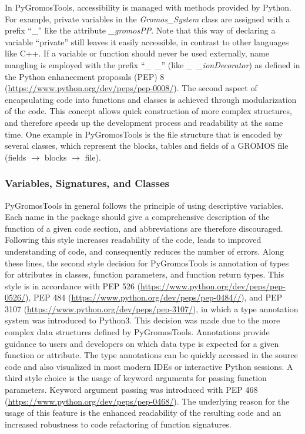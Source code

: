 In PyGromosTools, accessibility is managed with methods provided by Python. For example, private variables in the \textit{Gromos\_System} class are assigned with a prefix ``\_'' like the attribute \textit{\_gromosPP}. Note that this way of declaring a variable ``private'' still leaves it easily accessible, in contrast to other languages like C++. If a variable or function should never be used externally, name mangling is employed with the prefix ``\_~\_'' (like \textit{\_~\_ionDecorator}) as defined in the Python enhancement proposals (PEP) 8 (\url{https://www.python.org/dev/peps/pep-0008/}).
The second aspect of encapsulating code into functions and classes is achieved through modularization of the code. This concept allows quick construction of more complex structures, and therefore speeds up the development process and readability at the same time.\cite{Ganney2020}
One example in PyGromosTools is the file structure that is encoded by several classes, which represent the blocks, tables and fields of a GROMOS file (fields $\rightarrow$ blocks $\rightarrow$ file).

\subsubsection{Variables, Signatures, and Classes}
PyGromosTools in general follows the principle of using descriptive variables. Each name in the package should give a comprehensive description of the function of a given code section, and abbreviations are therefore discouraged. Following this style increases readability of the code, leads to improved understanding of code, and consequently reduces the number of errors. Along these lines, the second style decision for PyGromosTools is annotation of types for attributes in classes, function parameters, and function return types. This style is in accordance with PEP 526 (\url{https://www.python.org/dev/peps/pep-0526/}), PEP 484 (\url{https://www.python.org/dev/peps/pep-0484//}), and PEP 3107 (\url{https://www.python.org/dev/peps/pep-3107/}), in which a type annotation system was introduced to Python3. This decision was made due to the more complex data structures defined by PyGromosTools. Annotations provide guidance to users and developers on which data type is expected for a given function or attribute. The type annotations can be quickly accessed in the source code and also visualized in most modern IDEs or interactive Python sessions. A third style choice is the usage of keyword arguments for passing function parameters. Keyword argument passing was introduced with PEP 468 (\url{https://www.python.org/dev/peps/pep-0468/}). The underlying reason for the usage of this feature is the enhanced readability of the resulting code and an increased robustness to code refactoring of function signatures.

